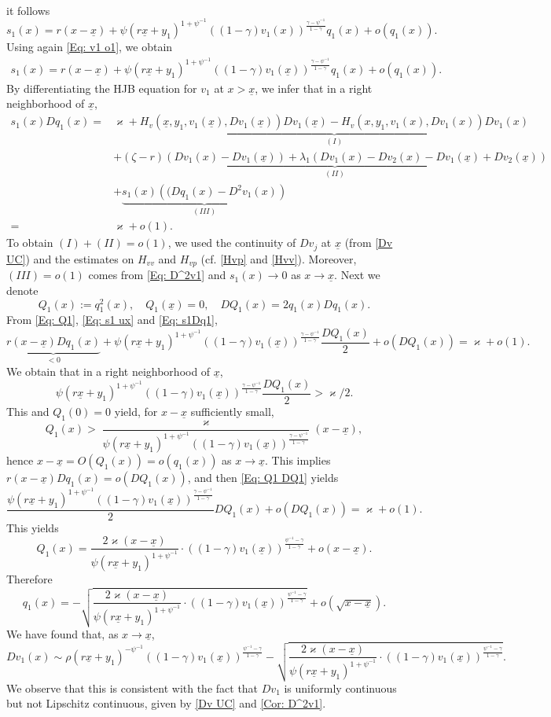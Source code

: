 \documentclass[11pt]{article}
\numberwithin{equation}{section}
\theoremstyle{definition}
\newcommand{\ux}{{\underline x}}
\newcommand{\beq}{\begin{equation}}
\newcommand{\eeq}{\end{equation}}
\newcommand{\ld}{\lambda}
\newcommand{\g}{\gamma}
\newcommand{\p}{\psi}
\newcommand{\z}{\zeta}
\newcommand{\lc}{\left(}
\newcommand{\rc}{\right)}
\theoremstyle{plain}
\begin{document}
\begin{appendices}
$$\begin{aligned}
\end{aligned}
$$
it follows
$$
s_1(x)= r(x-\ux)+\p \lc r\ux+y_1\rc^{1+\p^{-1}}((1-\g)v_1(x))^{\frac{\g-\p^{-1}}{1-\g}}q_1(x)+o(q_1(x)).
$$
Using again \cref{Eq: v1 o1}, we obtain
\beq\label{Eq: s1 ux}
\begin{aligned}
s_1(x)= r(x-\ux)+\p \lc r\ux+y_1\rc^{1+\p^{-1}}((1-\g)v_1(\ux))^{\frac{\g-\p^{-1}}{1-\g}}q_1(x)+o(q_1(x)).
\end{aligned}
\eeq
By differentiating the HJB equation for $v_1$ at $x>\ux$, we infer that in a right neighborhood of $\ux$,
\beq\label{Eq: s1Dq1}
\begin{aligned}
s_1(x)Dq_1(x)= {}&\varkappa+\underbrace{H_v(\ux,y_1,v_1(\ux),Dv_1(\ux))Dv_1(\ux)-H_v(x,y_1,v_1(x),Dv_1(x))Dv_1(x)}_{(I)}\\
&+\underbrace{(\z-r)(Dv_1(x)-Dv_1(\ux))+\ld_1(Dv_1(x)-Dv_2(x)-Dv_1(\ux)+Dv_2(\ux))}_{(II)}\\
&+\underbrace{s_1(x)\lc(Dq_1(x)-D^2v_1(x)\rc}_{(III)}\\
= {}&\varkappa+o(1).
\end{aligned}
\eeq
To obtain $(I)+(II)=o(1)$, we used the continuity of $Dv_j$ at $\ux$ (from \cref{Dv UC}) and the estimates on $H_{vv}$ and $H_{vp}$ (cf. \cref{Hvp} and \cref{Hvv}). Moreover, $(III)=o(1)$ comes from \cref{Eq: D^2v1} and $s_1(x)\to 0$ as $x\to \ux$. Next we denote
\beq\label{Eq: Q1}
Q_1(x):=q^2_1(x),\quad Q_1(\ux)=0,\quad DQ_1(x)=2q_1(x)Dq_1(x).
\eeq
From \cref{Eq: Q1}, \cref{Eq: s1 ux} and \cref{Eq: s1Dq1},
\beq\label{Eq: Q1 DQ1}
\underbrace{r(x-\ux)Dq_1(x)}_{<0}+\p \lc r\ux+y_1\rc^{1+\p^{-1}}((1-\g)v_1(\ux))^{\frac{\g-\p^{-1}}{1-\g}}\frac{DQ_1(x)}{2}+o(DQ_1(x))= {\varkappa}+o(1).
\eeq
We obtain that in a right neighborhood of $\ux$,
$$
\p \lc r\ux+y_1\rc^{1+\p^{-1}}((1-\g)v_1(\ux))^{\frac{\g-\p^{-1}}{1-\g}}\frac{DQ_1(x)}{2}>{\varkappa/2}.
$$
This and $Q_1(0)=0$ yield, for $x-\ux$ sufficiently small,
$$
Q_1(x)>\frac{{\varkappa}}{\p \lc r\ux+y_1\rc^{1+\p^{-1}}((1-\g)v_1(\ux))^{\frac{\g-\p^{-1}}{1-\g}}}(x-\ux),
$$
 hence $x-\ux=O(Q_1(x))=o(q_1(x))$ as $x\to \ux$. This implies $r(x-\ux)Dq_1(x)=o(DQ_1(x))$, and then \cref{Eq: Q1 DQ1} yields
$$
\frac{\p \lc r\ux+y_1\rc^{1+\p^{-1}}((1-\g)v_1(\ux))^{\frac{\g-\p^{-1}}{1-\g}}}{2}DQ_1(x)+o(DQ_1(x))=\varkappa+o(1).
$$
This yields
$$
Q_1(x)=\frac{2\varkappa(x-\ux)}{\p \lc r\ux+y_1\rc^{1+\p^{-1}}}\cdot ((1-\g)v_1(\ux))^{\frac{\p^{-1}-\g}{1-\g}}+o(x-\ux).
$$
Therefore 
$$
q_1(x)=-\sqrt{\frac{2\varkappa(x-\ux)}{\p \lc r\ux+y_1\rc^{1+\p^{-1}}}\cdot ((1-\g)v_1(\ux))^{\frac{\p^{-1}-\g}{1-\g}}}+o(\sqrt{x-\ux}).
$$
We have found that, as $x\to \ux$,
$$
Dv_1(x)\sim \rho (r\ux+y_1)^{-\p^{-1}}((1-\g)v_1(\ux))^{\frac{\p^{-1}-\g}{1-\g}}-\sqrt{\frac{2\varkappa(x-\ux)}{\p \lc r\ux+y_1\rc^{1+\p^{-1}}}\cdot ((1-\g)v_1(\ux))^{\frac{\p^{-1}-\g}{1-\g}}}.
$$
We observe that this is consistent with the fact that $Dv_1$ is uniformly continuous but not Lipschitz continuous, given by \cref{Dv UC} and \cref{Cor: D^2v1}.
\end{appendices}\par
\end{document}
